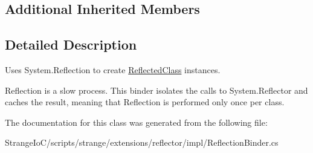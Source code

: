 \subsection*{Additional Inherited Members}


\subsection{Detailed Description}
Uses System.\-Reflection to create {\ttfamily \hyperlink{classstrange_1_1extensions_1_1reflector_1_1impl_1_1_reflected_class}{Reflected\-Class}} instances. 

Reflection is a slow process. This binder isolates the calls to System.\-Reflector and caches the result, meaning that Reflection is performed only once per class. 

The documentation for this class was generated from the following file\-:\begin{DoxyCompactItemize}
\item 
Strange\-Io\-C/scripts/strange/extensions/reflector/impl/Reflection\-Binder.\-cs\end{DoxyCompactItemize}
